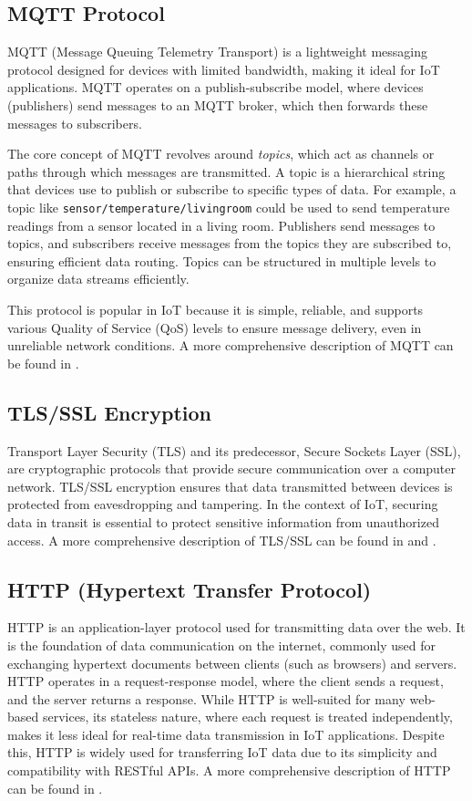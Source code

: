 \subsection*{MQTT Protocol}
\label{sec:mqtt-protocol}
MQTT (Message Queuing Telemetry Transport) is a lightweight messaging protocol designed for devices with limited bandwidth, making it ideal for IoT applications. MQTT operates on a publish-subscribe model, where devices (publishers) send messages to an MQTT broker, which then forwards these messages to subscribers. 

The core concept of MQTT revolves around \textit{topics}, which act as channels or paths through which messages are transmitted. A topic is a hierarchical string that devices use to publish or subscribe to specific types of data. For example, a topic like \texttt{sensor/temperature/livingroom} could be used to send temperature readings from a sensor located in a living room. Publishers send messages to topics, and subscribers receive messages from the topics they are subscribed to, ensuring efficient data routing. Topics can be structured in multiple levels to organize data streams efficiently.

This protocol is popular in IoT because it is simple, reliable, and supports various Quality of Service (QoS) levels to ensure message delivery, even in unreliable network conditions. A more comprehensive description of MQTT can be found in \cite{site:mqtt}.


\subsection*{TLS/SSL Encryption}
\label{sec:tls-ssl-encryption}
Transport Layer Security (TLS) and its predecessor, Secure Sockets Layer (SSL), are cryptographic protocols that provide secure communication over a computer network. TLS/SSL encryption ensures that data transmitted between devices is protected from eavesdropping and tampering. In the context of IoT, securing data in transit is essential to protect sensitive information from unauthorized access.
A more comprehensive description of TLS/SSL can be found in \cite{site:tls} and \cite{site:ssl}.

\subsection*{HTTP (Hypertext Transfer Protocol)}
\label{sec:http}
HTTP is an application-layer protocol used for transmitting data over the web. It is the foundation of data communication on the internet, commonly used for exchanging hypertext documents between clients (such as browsers) and servers. HTTP operates in a request-response model, where the client sends a request, and the server returns a response. While HTTP is well-suited for many web-based services, its stateless nature, where each request is treated independently, makes it less ideal for real-time data transmission in IoT applications. Despite this, HTTP is widely used for transferring IoT data due to its simplicity and compatibility with RESTful APIs. A more comprehensive description of HTTP can be found in \cite{site:http}.

